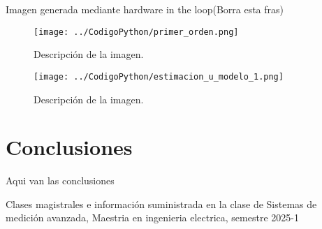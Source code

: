 \documentclass[conference]{IEEEtran}
\begin{document}
Imagen generada mediante hardware in the loop(Borra esta fras)


\begin{figure}[h]
	\centering
	\texttt{[image: ../CodigoPython/primer\_orden.png]}
	\caption{Descripción de la imagen.}
	\label{fig:etiqueta}
\end{figure}

\begin{figure}[h]
	\centering
	\texttt{[image: ../CodigoPython/estimacion\_u\_modelo\_1.png]}
	\caption{Descripción de la imagen.}
	\label{fig:etiqueta}
\end{figure}



\section{Conclusiones}

Aqui van las conclusiones

\begin{thebibliography}{00}

	\item Clases magistrales e información suministrada en la clase de Sistemas de medición avanzada, Maestria en ingenieria electrica, semestre 2025-1

\end{thebibliography}
\end{document}
